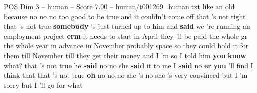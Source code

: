 \begin{textsample}{POS Dim 3 – human – Score 7.00 – human/t001269\_human.txt}  \label{ex:f3_pos_017}
like an old because no no no too good to be true and it couldn't come off that 's not right that 's not true \textbf{somebody} 's just turned up to him and \textbf{said} we 're running an employment project \textbf{erm} it needs to start in April they 'll be paid the whole gr the whole year in advance in November probably space so they could hold it for them till November till they get their money and I 'm so I told him \textbf{you} \textbf{know} what? that 's not true he \textbf{said} no no she \textbf{said} it to me I \textbf{said} no \textbf{er} \textbf{you} 'll find I think that that 's not true \textbf{oh} no no no she 's no she 's very convinced but I 'm sorry but I 'll go for what

\end{textsample}
